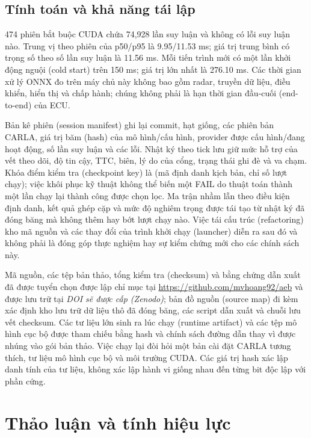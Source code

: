 \documentclass[conference]{IEEEtran}
\newcommand{\artifactdoi}{\textit{DOI sẽ được cấp (Zenodo)}}
\begin{document}
\subsection{Tính toán và khả năng tái lập}
474 phiên bắt buộc CUDA chứa 74,928 lần suy luận và không có lỗi suy luận nào.
Trung vị theo phiên của p50/p95 là 9.95/11.53 ms; giá trị trung bình có trọng
số theo số lần suy luận là 11.56 ms. Mỗi tiến trình mới có một lần khởi động
nguội (cold start) trên 150 ms; giá trị lớn nhất là 276.10 ms. Các thời gian
xử lý ONNX đo trên máy chủ này không bao gồm radar, truyền dữ liệu, điều khiển,
hiển thị và chấp hành; chúng không phải là hạn thời gian đầu-cuối (end-to-end)
của ECU.

Bản kê phiên (session manifest) ghi lại commit, hạt giống, các phiên bản CARLA,
giá trị băm (hash) của mô hình/cấu hình, provider được cấu hình/đang hoạt
động, số lần suy luận và các lỗi. Nhật ký theo tick lưu giữ mức hỗ trợ của vết
theo dõi, độ tin cậy, TTC, biên, lý do của cổng, trạng thái ghi đè và va chạm.
Khóa điểm kiểm tra (checkpoint key) là (mã định danh kịch bản, chỉ số lượt
chạy); việc khôi phục kỹ thuật không thể biến một FAIL do thuật toán thành một
lần chạy lại thành công được chọn lọc. Ma trận nhầm lẫn theo điều kiện định
danh, kết quả ghép cặp và mức độ nghiêm trọng được tái tạo từ nhật ký đã đóng
băng mà không thêm hay bớt lượt chạy nào. Việc tái cấu trúc (refactoring) kho
mã nguồn và các thay đổi của trình khởi chạy (launcher) diễn ra sau đó và
không phải là đóng góp thực nghiệm hay sự kiểm chứng mới cho các chính sách
này.

Mã nguồn, các tệp bản thảo, tổng kiểm tra (checksum) và bằng chứng dẫn xuất đã
được tuyển chọn được lập chỉ mục tại \url{https://github.com/mvhoang92/aeb} và
được lưu trữ tại \artifactdoi; bản đồ nguồn (source map) đi kèm xác định kho
lưu trữ dữ liệu thô đã đóng băng, các script dẫn xuất và chuỗi lưu vết
checksum. Các tư liệu lớn sinh ra lúc chạy (runtime artifact) và các tệp mô
hình cục bộ được tham chiếu bằng hash và chính sách đường dẫn thay vì được
nhúng vào gói bản thảo. Việc chạy lại đòi hỏi một bản cài đặt CARLA tương
thích, tư liệu mô hình cục bộ và môi trường CUDA. Các giá trị hash xác lập danh
tính của tư liệu, không xác lập hành vi giống nhau đến từng bit độc lập với
phần cứng.

\section{Thảo luận và tính hiệu lực}
\end{document}
